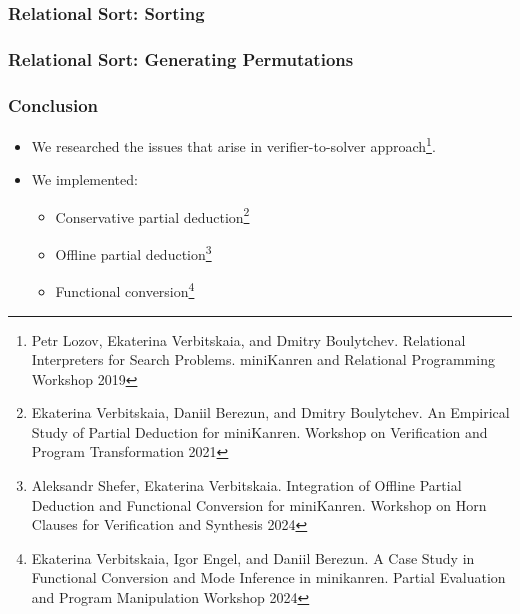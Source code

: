 \documentclass[xcolor={dvipsnames}, aspectratio=169]{beamer}
\begin{document}
\begin{frame}[fragile]
  \frametitle{Relational Sort: Sorting}
    
\end{frame}


\begin{frame}[fragile]
  \frametitle{Relational Sort: Generating Permutations}
    
\end{frame}


%     

%     

\begin{frame}[fragile]
  \frametitle{Conclusion}

\begin{itemize}
  \item We researched the issues that arise in verifier-to-solver approach\footnote{Petr Lozov, Ekaterina Verbitskaia, and Dmitry Boulytchev. Relational Interpreters for Search Problems. miniKanren and Relational Programming Workshop 2019}. 
  \item We implemented: 
  \begin{itemize}
    \item Conservative partial deduction\footnote{Ekaterina Verbitskaia, Daniil Berezun, and Dmitry Boulytchev. An Empirical Study of Partial Deduction
    for miniKanren. Workshop on Verification and Program Transformation 2021} 
    \item Offline partial deduction\footnote{Aleksandr Shefer, Ekaterina Verbitskaia. Integration of Offline Partial Deduction and
    Functional Conversion for miniKanren. Workshop on Horn Clauses for Verification and Synthesis 2024}
    \item Functional conversion\footnote{Ekaterina Verbitskaia, Igor Engel, and Daniil Berezun. A Case Study in Functional Conversion and Mode Inference in minikanren. Partial Evaluation and Program Manipulation Workshop 2024}
  \end{itemize}
\end{itemize}
\end{frame}
\end{document}
